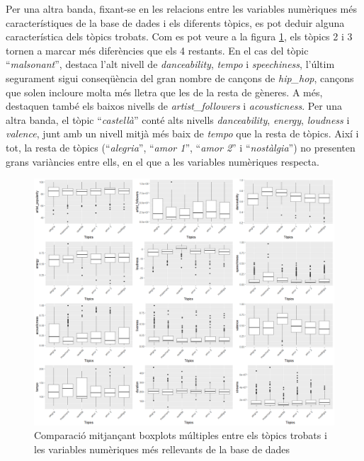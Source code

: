 Per una altra banda, fixant-se en les relacions entre les variables numèriques més característiques de la base de dades i els diferents tòpics, es pot deduir alguna característica dels tòpics trobats. Com es pot veure a la figura \ref{fig:LDA:num_profiling}, els tòpics 2 i 3 tornen a marcar més diferències que els 4 restants. En el cas del tòpic ``\textit{malsonant}'', destaca l'alt nivell de \textit{danceability}, \textit{tempo} i \textit{speechiness}, l'últim segurament sigui conseqüència del gran nombre de cançons de \textit{hip\_hop}, cançons que solen incloure molta més lletra que les de la resta de gèneres. A més, destaquen també els baixos nivells de \textit{artist\_followers} i \textit{acousticness}. Per una altra banda, el tòpic ``\textit{castellà}'' conté alts nivells \textit{danceability}, \textit{energy}, \textit{loudness} i \textit{valence}, junt amb un nivell mitjà més baix de \textit{tempo} que la resta de tòpics. Així i tot, la resta de tòpics (``\textit{alegria}'', ``\textit{amor 1}'', ``\textit{amor 2}'' i ``\textit{nostàlgia}'') no presenten grans variàncies entre ells, en el que a les variables numèriques respecta.

\begin{figure}[H]
    \centering
    \includegraphics[width=0.95\linewidth]{Images/8_Textual/LDA/profiling_nums.png}
    \caption{Comparació mitjançant boxplots múltiples entre els tòpics trobats i les variables numèriques més rellevants de la base de dades}
    \label{fig:LDA:num_profiling}
\end{figure}

